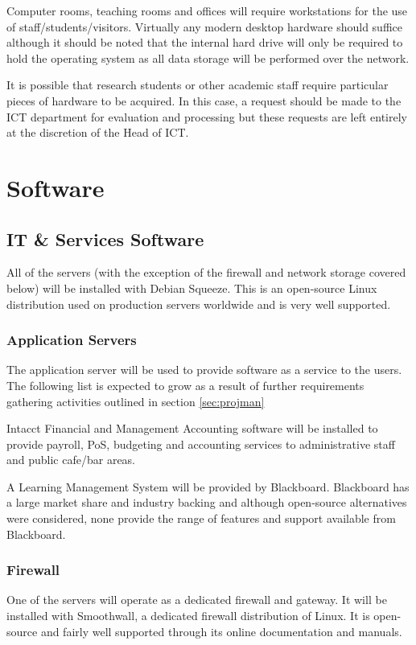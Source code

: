 \documentclass[a4paper, twoside]{article}
\begin{document}
Computer rooms, teaching rooms and offices will require workstations for the use
of staff/students/visitors. Virtually any modern desktop hardware should suffice
although it should be noted that the internal hard drive will only be required
to hold the operating system as all data storage will be performed over the
network.

It is possible that research students or other academic staff require particular
pieces of hardware to be acquired. In this case, a request should be made to the
ICT department for evaluation and processing but these requests are left
entirely at the discretion of the Head of ICT.

\section{Software}
\subsection{IT \& Services Software}
All of the servers (with the exception of the firewall and network storage
covered below) will be installed with Debian Squeeze. This is an open-source
Linux distribution used on production servers worldwide\cite{debian} and is
very well supported.

\subsubsection{Application Servers}
The application server will be used to provide software as a service to the
users. The following list is expected to grow as a result of further
requirements gathering activities outlined in section \ref{sec:projman}

Intacct Financial and Management Accounting software will be installed to
provide payroll, PoS, budgeting and accounting services to administrative staff
and public cafe/bar areas.

A Learning Management System will be provided by Blackboard. Blackboard has a
large market share and industry backing \cite{bb} and although open-source
alternatives were considered, none provide the range of features and support
available from Blackboard.

\subsubsection{Firewall}
One of the servers will operate as a dedicated firewall and gateway. It will be
installed with Smoothwall, a dedicated firewall distribution of Linux. It is
open-source and fairly well supported through its online documentation and
manuals.
\end{document}
